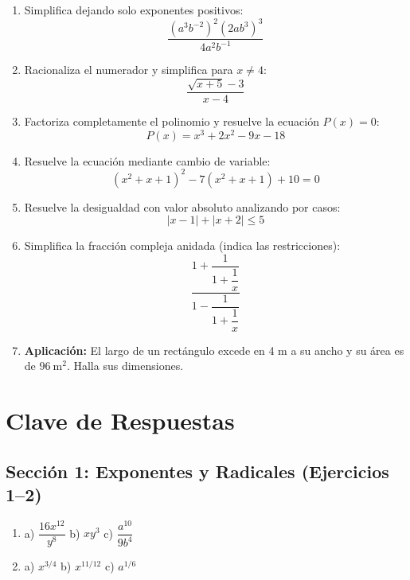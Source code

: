 \documentclass[12pt, letterpaper]{article}
\begin{document}
\begin{enumerate}[resume=ejercicios, leftmargin=*]
      \item \facil{} Simplifica dejando solo exponentes positivos:
            $$\frac{(a^3 b^{-2})^2 (2a b^3)^3}{4 a^2 b^{-1}}$$

      \item \medio{} Racionaliza el numerador y simplifica para $x \neq 4$:
            $$\frac{\sqrt{x + 5} - 3}{x - 4}$$

      \item \medio{} Factoriza completamente el polinomio y resuelve la ecuación $P(x) = 0$:
            $$P(x) = x^3 + 2x^2 - 9x - 18$$

      \item \dificil{} Resuelve la ecuación mediante cambio de variable:
            $$(x^2 + x + 1)^2 - 7(x^2 + x + 1) + 10 = 0$$

      \item \dificil{} Resuelve la desigualdad con valor absoluto analizando por casos:
            $$|x - 1| + |x + 2| \le 5$$

      \item \muyDificil{} Simplifica la fracción compleja anidada (indica las restricciones):
            $$\frac{1 + \dfrac{1}{1 + \dfrac{1}{x}}}{1 - \dfrac{1}{1 + \dfrac{1}{x}}}$$

      \item \medio{} \textbf{Aplicación:} El largo de un rectángulo excede en 4 m a su ancho y su área es de $96\ \text{m}^2$. Halla sus dimensiones.
\end{enumerate}

\ifmwclaves
      \section{Clave de Respuestas}

      \subsection*{Sección 1: Exponentes y Radicales (Ejercicios 1--2)}
      \begin{enumerate}[series=respuestas, leftmargin=*, label=\textbf{\arabic*.}]
            \item a) $\dfrac{16x^{12}}{y^8}$ \quad b) $x y^3$ \quad c) $\dfrac{a^{10}}{9 b^4}$
            \item a) $x^{3/4}$ \quad b) $x^{11/12}$ \quad c) $a^{1/6}$
      \end{enumerate}
\end{document}
